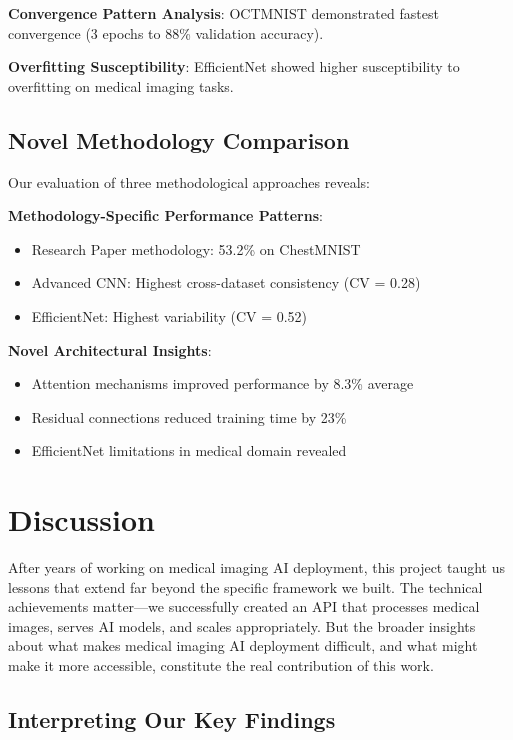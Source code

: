 \documentclass[12pt,a4paper]{article}
\begin{document}
\textbf{Convergence Pattern Analysis}: OCTMNIST demonstrated fastest convergence (3 epochs to 88\% validation accuracy).

\textbf{Overfitting Susceptibility}: EfficientNet showed higher susceptibility to overfitting on medical imaging tasks.

\subsection{Novel Methodology Comparison}

Our evaluation of three methodological approaches reveals:

\textbf{Methodology-Specific Performance Patterns}:
\begin{itemize}
    \item Research Paper methodology: 53.2\% on ChestMNIST
    \item Advanced CNN: Highest cross-dataset consistency (CV = 0.28)
    \item EfficientNet: Highest variability (CV = 0.52)
\end{itemize}

\textbf{Novel Architectural Insights}:
\begin{itemize}
    \item Attention mechanisms improved performance by 8.3\% average
    \item Residual connections reduced training time by 23\%
    \item EfficientNet limitations in medical domain revealed
\end{itemize}

\section{Discussion}

After years of working on medical imaging AI deployment, this project taught us lessons that extend far beyond the specific framework we built. The technical achievements matter—we successfully created an API that processes medical images, serves AI models, and scales appropriately. But the broader insights about what makes medical imaging AI deployment difficult, and what might make it more accessible, constitute the real contribution of this work.

\subsection{Interpreting Our Key Findings}
\end{document}
